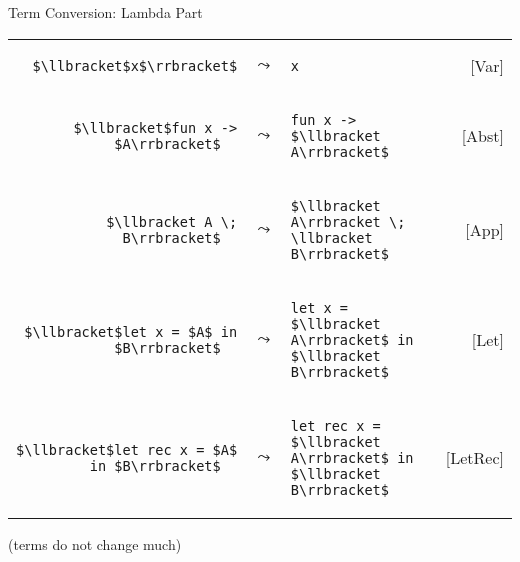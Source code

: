 \documentclass{beamer}
\let\\\tabularnewline
\let\\\tabularnewline
\theoremstyle{definition}
\begin{document}
\begin{frame}[fragile]{Term Conversion: Lambda Part}

\begin{tabular}{rclr}
  \begin{lstlisting}
$\llbracket$x$\rrbracket$
  \end{lstlisting} &
  $\leadsto$ &
  \begin{lstlisting}
x
  \end{lstlisting} &
  [Var] \\
  \begin{lstlisting}
$\llbracket$fun x -> $A\rrbracket$  
  \end{lstlisting} &
  $\leadsto$ &
  \begin{lstlisting}
fun x -> $\llbracket A\rrbracket$
  \end{lstlisting} &
  [Abst] \\
  \begin{lstlisting}
$\llbracket A \; B\rrbracket$  
  \end{lstlisting} &
  $\leadsto$ &
  \begin{lstlisting}
$\llbracket A\rrbracket \; \llbracket B\rrbracket$
  \end{lstlisting} &
  [App] \\
\begin{lstlisting}
$\llbracket$let x = $A$ in $B\rrbracket$  
  \end{lstlisting} &
  $\leadsto$ &
  \begin{lstlisting}
let x = $\llbracket A\rrbracket$ in $\llbracket B\rrbracket$
  \end{lstlisting} &
  [Let] \\
  \begin{lstlisting}
$\llbracket$let rec x = $A$ in $B\rrbracket$  
  \end{lstlisting} &
  $\leadsto$ &
  \begin{lstlisting}
let rec x = $\llbracket A\rrbracket$ in $\llbracket B\rrbracket$
  \end{lstlisting} &
  [LetRec] \\
\end{tabular}

 \vskip1cm
 \begin{center}
   (terms do not change much) %
 \end{center}

\end{frame}

\end{document}
